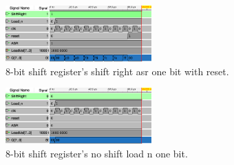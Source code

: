 \documentclass{article}
\begin{document}
\begin{enumerate}
\begin{figure}[ht!]
    \centering
    \includegraphics[width=0.5\textwidth]{lab4_timing_shift_right_asr_one_bit.png}
    \caption{8-bit shift register's shift right asr one bit with reset.}
    \label{f:timing_shifter_bit}
\end{figure}

\begin{figure}[ht!]
    \centering
    \includegraphics[width=0.5\textwidth]{lab4_timing_no_shift_load_n_one_bit.png}
    \caption{8-bit shift register's no shift load n one bit.}
    \label{f:timing_shifter_bit}
\end{figure}

\end{enumerate}
\end{document}
